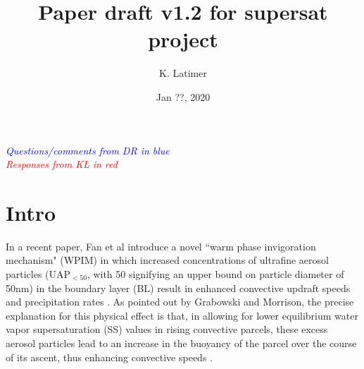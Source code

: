 \documentclass{article}
\title{Paper draft v1.2 for supersat project}
\author{K. Latimer}
\date{Jan ??, 2020}
\newcommand{\drcomm}[1]{\textcolor{blue}{\textit{#1}}}
\newcommand{\klcomm}[1]{\textcolor{red}{\textit{#1}}}
\begin{document}
\maketitle

\noindent\drcomm{Questions/comments from DR in blue} \\
\noindent\klcomm{Responses from KL in red}\\

\section{Intro}

In a recent paper, Fan et al introduce a novel ``warm phase invigoration mechanism" (WPIM) in which increased concentrations of ultrafine aerosol particles (UAP$_{<50}$, with 50 signifying an upper bound on particle diameter of 50nm) in the boundary layer (BL) result in enhanced convective updraft speeds and precipitation rates \cite{Fan2018}. As pointed out by Grabowski and Morrison, the precise explanation for this physical effect is that, in allowing for lower equilibrium water vapor supersaturation (SS) values in rising convective parcels, these excess aerosol particles lead to an increase in the buoyancy of the parcel over the course of its ascent, thus enhancing convective speeds \cite{Grabowski2020}.
\end{document}
